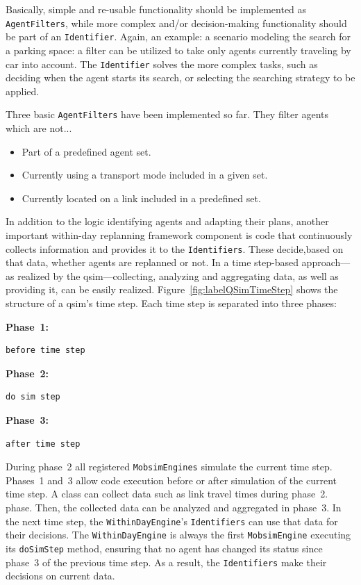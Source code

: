 Basically, simple and re-usable functionality should be implemented as \lstinline{AgentFilters}, while more complex and/or decision-making functionality should be part of an \lstinline{Identifier}. Again, an example: \eg a scenario modeling the search for a parking space: a filter can be utilized to take only agents currently traveling by car into account. The \lstinline{Identifier} solves the more complex tasks, such as deciding when the agent starts its search, or selecting the searching strategy to be applied.
%

Three basic \lstinline{AgentFilters} have been implemented so far. They filter agents which are not...
\begin{itemize}\styleItemize
    \item Part of a predefined agent set.
    \item Currently using a transport mode included in a given set.
    \item Currently located on a link included in a predefined set.
\end{itemize}
%

In addition to the logic identifying agents and adapting their plans, another important within-day replanning framework component is code that continuously collects information and provides it to the \lstinline{Identifiers}. These decide,based on that data, whether agents are replanned or not. In a time step-based approach---as realized by the \gls{qsim}---collecting, analyzing and aggregating data, as well as providing it, can be easily realized. Figure~\ref{fig:labelQSimTimeStep} shows the structure of a \gls{qsim}'s time step. Each time step is separated into three phases:

\textbf{Phase~1:} 
\begin{lstlisting} 
before time step 
\end{lstlisting}

\textbf{Phase~2:} 
\begin{lstlisting} 
do sim step 
\end{lstlisting}
 
\textbf{Phase~3:} 
\begin{lstlisting} 
after time step 
\end{lstlisting}
%
During phase~2
all registered \lstinline{MobsimEngines} simulate the current time step. 
Phases~1 and~3 allow code execution before or after simulation of the current time step. 
A class can collect data such as link travel times during phase~2. 
phase. Then, the collected data can be analyzed and aggregated in phase~3. 
In the next time step, the \lstinline{WithinDayEngine}'s \lstinline{Identifiers} can use that data for their decisions. The \lstinline{WithinDayEngine} is always the first \lstinline{MobsimEngine} executing its \lstinline{doSimStep} method, ensuring that no agent has changed its status since phase~3 
of the previous time step. As a result, the \lstinline{Identifiers} make their decisions on %
current data.

